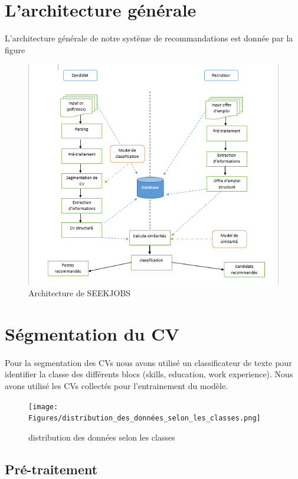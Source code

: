 \documentclass{article}
\begin{document}
\section{L'architecture générale}
L'architecture générale de notre système de recommandations est donnée par la figure
\begin{figure}[H]
  \includegraphics[width=\linewidth ]{Figures/architecture.png}
  \caption{\label{arch}Architecture de SEEKJOBS}

\end{figure}	


 
\section{Ségmentation du CV }
\paragraph{}Pour la segmentation des CVs nous avons utilisé un classificateur de texte pour identifier la classe des différents blocs (skills, education, work experience). Nous avons utilisé les CVs collectés pour l'entrainement du modèle. 
\begin{figure}[H]
  \texttt{[image: Figures/distribution\_des\_données\_selon\_les\_classes.png]}
  \caption{\label{arch}distribution des données selon les classes}
\end{figure}

\subsection{Pré-traitement }
\end{document}
